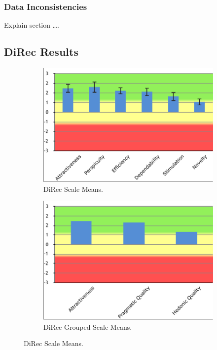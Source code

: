 \subsubsection{Data Inconsistencies}
Explain section \ldots .

\subsection{DiRec Results}

\begin{figure}
\centering
\begin{subfigure}[b]{0.5\textwidth}
\includegraphics[width=\textwidth]{figures/direc-results}
\caption{DiRec Scale Means.}
\label{fig:figure54b}
\end{subfigure}
\begin{subfigure}[b]{0.5\textwidth}
\includegraphics[width=\textwidth]{figures/direc-results2}
\caption{DiRec Grouped Scale Means.}
\label{fig:figure54a}
\end{subfigure}
\caption{DiRec Scale Means.}
\label{fig:figure54}
\end{figure}

